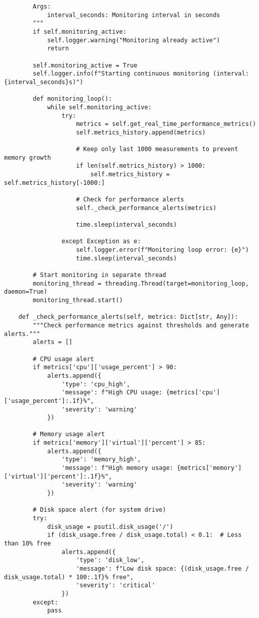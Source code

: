 \documentclass[11pt,a4paper]{article}
\begin{document}
\begin{verbatim}
        Args:
            interval_seconds: Monitoring interval in seconds
        """
        if self.monitoring_active:
            self.logger.warning("Monitoring already active")
            return

        self.monitoring_active = True
        self.logger.info(f"Starting continuous monitoring (interval: {interval_seconds}s)")

        def monitoring_loop():
            while self.monitoring_active:
                try:
                    metrics = self.get_real_time_performance_metrics()
                    self.metrics_history.append(metrics)

                    # Keep only last 1000 measurements to prevent memory growth
                    if len(self.metrics_history) > 1000:
                        self.metrics_history = self.metrics_history[-1000:]

                    # Check for performance alerts
                    self._check_performance_alerts(metrics)

                    time.sleep(interval_seconds)

                except Exception as e:
                    self.logger.error(f"Monitoring loop error: {e}")
                    time.sleep(interval_seconds)

        # Start monitoring in separate thread
        monitoring_thread = threading.Thread(target=monitoring_loop, daemon=True)
        monitoring_thread.start()

    def _check_performance_alerts(self, metrics: Dict[str, Any]):
        """Check performance metrics against thresholds and generate alerts."""
        alerts = []

        # CPU usage alert
        if metrics['cpu']['usage_percent'] > 90:
            alerts.append({
                'type': 'cpu_high',
                'message': f"High CPU usage: {metrics['cpu']['usage_percent']:.1f}%",
                'severity': 'warning'
            })

        # Memory usage alert
        if metrics['memory']['virtual']['percent'] > 85:
            alerts.append({
                'type': 'memory_high',
                'message': f"High memory usage: {metrics['memory']['virtual']['percent']:.1f}%",
                'severity': 'warning'
            })

        # Disk space alert (for system drive)
        try:
            disk_usage = psutil.disk_usage('/')
            if (disk_usage.free / disk_usage.total) < 0.1:  # Less than 10% free
                alerts.append({
                    'type': 'disk_low',
                    'message': f"Low disk space: {(disk_usage.free / disk_usage.total) * 100:.1f}% free",
                    'severity': 'critical'
                })
        except:
            pass


\end{verbatim}
\end{document}
